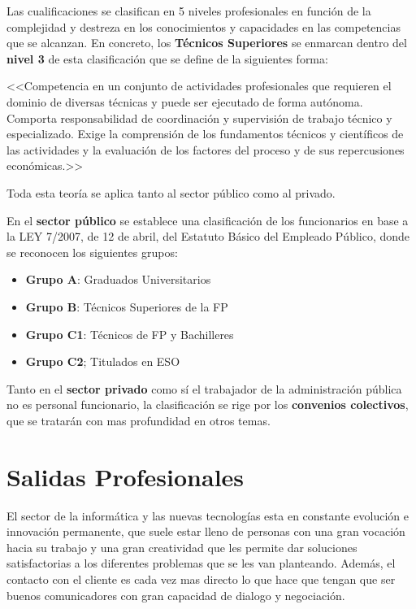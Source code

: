 Las cualificaciones se clasifican en 5 niveles profesionales en función de la complejidad y destreza en los conocimientos y capacidades en las competencias que se alcanzan. En concreto, los \textbf{Técnicos Superiores} se enmarcan dentro del\textbf{ nivel 3} de esta clasificación que se define de la siguientes forma:

<<Competencia en un conjunto de actividades profesionales que requieren el dominio de diversas técnicas y puede ser ejecutado de forma autónoma. Comporta responsabilidad de coordinación y supervisión de trabajo técnico y especializado. Exige la comprensión de los fundamentos técnicos y científicos de las actividades y la evaluación de los factores del proceso y de sus repercusiones económicas.>>

Toda esta teoría se aplica tanto al sector público como al privado.

En el \textbf{sector público} se establece una clasificación de los funcionarios en base a la LEY 7/2007, de 12 de abril, del Estatuto Básico del Empleado Público, donde se reconocen los siguientes grupos:

\begin{itemize}
    \item \textbf{Grupo A}: Graduados Universitarios
    \item \textbf{Grupo B}: Técnicos Superiores de la FP
    \item \textbf{Grupo C1}: Técnicos de FP y Bachilleres
    \item \textbf{Grupo C2}; Titulados en ESO
\end{itemize}

Tanto en el {\bfseries sector privado} como sí el trabajador de la administración pública no es personal funcionario, la clasificación se rige por los \textbf{\gls{convenios colectivos}}, que se tratarán con mas profundidad en otros temas.

\section{Salidas Profesionales}
El sector de la informática y las nuevas tecnologías esta en constante evolución e innovación permanente, que suele estar lleno de personas con una gran vocación hacia su trabajo y una gran creatividad que les permite dar soluciones satisfactorias a los diferentes problemas que se les van planteando. Además, el contacto con el cliente es cada vez mas directo lo que hace que tengan que ser buenos comunicadores con gran capacidad de dialogo y negociación.

